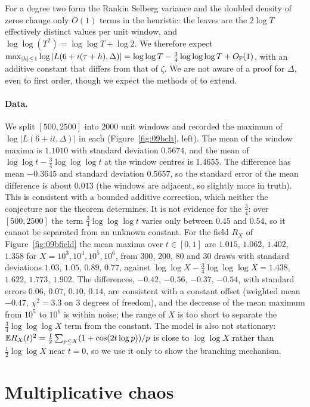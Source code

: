For a degree two form the Rankin Selberg variance and the doubled density of zeros change only $O(1)$ terms in the heuristic: the leaves are the $2\log T$ effectively distinct values per unit window, and $\log\log(T^2)=\log\log T+\log2$. We therefore expect $\max_{|h|\le1}\log|L(6+i(\tau+h),\Delta)|=\log\log T-\frac34\log\log\log T+O_{\mathbb{P}}(1)$, with an additive constant that differs from that of $\zeta$. We are not aware of a proof for $\Delta$, even to first order, though we expect the methods of \cite{abbrs2019} to extend.

\paragraph{Data.} We split $[500,2500]$ into $2000$ unit windows and recorded the maximum of $\log|L(6+it,\Delta)|$ in each (Figure~\ref{fig:09bclt}, left). The mean of the window maxima is $1.1010$ with standard deviation $0.5674$, and the mean of $\log\log t-\frac34\log\log\log t$ at the window centres is $1.4655$. The difference has mean $-0.3645$ and standard deviation $0.5657$, so the standard error of the mean difference is about $0.013$ (the windows are adjacent, so slightly more in truth). This is consistent with a bounded additive correction, which neither the conjecture nor the theorem determines. It is not evidence for the $\frac34$: over $[500,2500]$ the term $\frac34\log\log\log t$ varies only between $0.45$ and $0.54$, so it cannot be separated from an unknown constant. For the field $R_X$ of Figure~\ref{fig:09bfield} the mean maxima over $t\in[0,1]$ are $1.015$, $1.062$, $1.402$, $1.358$ for $X=10^3,10^4,10^5,10^6$, from $300$, $200$, $80$ and $30$ draws with standard deviations $1.03$, $1.05$, $0.89$, $0.77$, against $\log\log X-\frac34\log\log\log X=1.438$, $1.622$, $1.773$, $1.902$. The differences, $-0.42$, $-0.56$, $-0.37$, $-0.54$, with standard errors $0.06$, $0.07$, $0.10$, $0.14$, are consistent with a constant offset (weighted mean $-0.47$, $\chi^2=3.3$ on $3$ degrees of freedom), and the decrease of the mean maximum from $10^5$ to $10^6$ is within noise; the range of $X$ is too short to separate the $\frac34\log\log\log X$ term from the constant. The model is also not stationary: $\mathbb{E} R_X(t)^2=\frac12\sum_{p\le X}(1+\cos(2t\log p))/p$ is close to $\log\log X$ rather than $\frac12\log\log X$ near $t=0$, so we use it only to show the branching mechanism.

\section{Multiplicative chaos}\label{sec:09bchaos}

